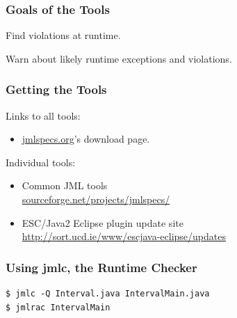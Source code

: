 \begin{frame}
\frametitle{Goals of the Tools}
\begin{description}
\item[jmlc:]
Find violations at runtime.

\item[ESC/Java2:]
Warn about likely runtime exceptions and violations.
\end{description}
\end{frame}

\begin{frame}
\frametitle{Getting the Tools}

Links to all tools:
\begin{itemize}
\item
\href{http://www.jmlspecs.org/}{jmlspecs.org}'s download page.
\end{itemize}


Individual tools:
\begin{itemize}
\item
Common JML tools \\
\href{http://sourceforge.net/projects/jmlspecs/}{sourceforge.net/projects/jmlspecs/}

\item
ESC/Java2 Eclipse plugin update site \\
\href{http://sort.ucd.ie/www/escjava-eclipse/updates}{http://sort.ucd.ie/www/escjava-eclipse/updates}
\end{itemize}
\end{frame}

\begin{frame}[fragile]
\frametitle{Using jmlc, the Runtime Checker}

\begin{example}
\begin{verbatim}
$ jmlc -Q Interval.java IntervalMain.java
$ jmlrac IntervalMain
\end{verbatim}
\end{example}
\end{frame}

